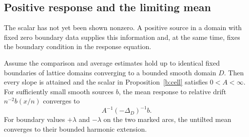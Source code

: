 \subsection{Positive response and the limiting mean}

The scalar has not yet been shown nonzero. A positive source in a domain
with fixed zero boundary data supplies this information and, at the same
time, fixes the boundary condition in the response equation.

\begin{proposition}\label{b:response}
Assume the comparison and average estimates hold up to identical fixed
boundaries of lattice domains converging to a bounded smooth domain $D$.
Then every slope is attained and the scalar in Proposition~\ref{b:cell}
satisfies $0<A<\infty$. For sufficiently small smooth sources $b$, the
mean response to relative drift $n^{-2}b(x/n)$ converges to
\[
 A^{-1}(-\Delta_D)^{-1}b.
\]
For boundary values $+\lambda$ and $-\lambda$ on the two marked arcs,
the untilted mean converges to their bounded harmonic extension.
\end{proposition}

